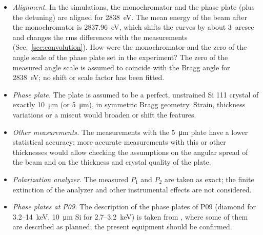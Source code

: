 \documentclass{iucr}
\newcommand{\todo}[1]{{\color{red}[TODO: "#1'']}}
\begin{document}
\begin{itemize}
\item {\it Alignment.} In the simulations, the monochromator and the phase plate (plus the detuning) are aligned for 2838~eV. The mean energy of the beam after the monochromator is 2837.96~eV, which shifts the curves by about 3~arcsec and changes the rms differences with the measurements (Sec.~\ref{sec:convolution}). How were the monochromator and the zero of the angle scale of the phase plate set in the experiment? The zero of the measured angle scale is assumed to coincide with the Bragg angle for 2838~eV; no shift or scale factor has been fitted.
\item {\it Phase plate.} The plate is assumed to be a perfect, unstrained Si 111 crystal of exactly \SI{10}{\micro\meter} (or \SI{5}{\micro\meter}), in symmetric Bragg geometry. Strain, thickness variations or a miscut would broaden or shift the features.
\item {\it Other measurements.} The measurements with the \SI{5}{\micro\meter} plate have a lower statistical accuracy; more accurate measurements with this or other thicknesses would allow checking the assumptions on the angular spread of the beam and on the thickness and crystal quality of the plate.
\item {\it Polarization analyzer.} The measured $P_1$ and $P_2$ are taken as exact; the finite extinction of the analyzer and other instrumental effects are not considered.
\item {\it Phase plates at P09.} The description of the phase plates of P09 (diamond for 3.2--14~keV, \SI{10}{\micro\meter} Si for 2.7--3.2~keV) is taken from \cite{Strempfer2013}, where some of them are described as planned; the present equipment should be confirmed.
\end{itemize}



\end{document}
